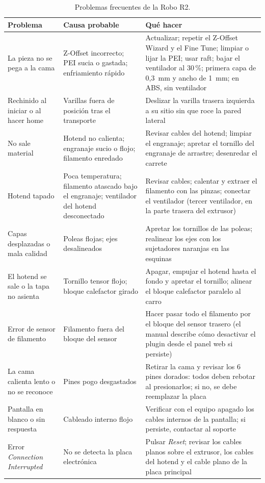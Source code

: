\begin{table}[H]
    \centering
    \caption{Problemas frecuentes de la Robo R2.}
    \label{tab:problemas}
    \small
    \begin{tabularx}{\linewidth}{>{\raggedright\arraybackslash}p{3.2cm} >{\raggedright\arraybackslash}X >{\raggedright\arraybackslash}X}
        \toprule
        \textbf{Problema} & \textbf{Causa probable} & \textbf{Qué hacer} \\
        \midrule
        La pieza no se pega a la cama & Z-Offset incorrecto; PEI sucia o gastada; enfriamiento rápido & Actualizar; repetir el Z-Offset Wizard y el Fine Tune; limpiar o lijar la PEI; usar raft; bajar el ventilador al 30\,\%; primera capa de 0,3~mm y ancho de 1~mm; en ABS, sin ventilador \\
        \midrule
        Rechinido al iniciar o al hacer home & Varillas fuera de posición tras el transporte & Deslizar la varilla trasera izquierda a su sitio sin que roce la pared lateral \\
        \midrule
        No sale material & Hotend no calienta; engranaje sucio o flojo; filamento enredado & Revisar cables del hotend; limpiar el engranaje; apretar el tornillo del engranaje de arrastre; desenredar el carrete \\
        \midrule
        Hotend tapado & Poca temperatura; filamento atascado bajo el engranaje; ventilador del hotend desconectado & Revisar cables; calentar y extraer el filamento con las pinzas; conectar el ventilador (tercer ventilador, en la parte trasera del extrusor) \\
        \midrule
        Capas desplazadas o mala calidad & Poleas flojas; ejes desalineados & Apretar los tornillos de las poleas; realinear los ejes con los sujetadores naranjas en las esquinas \\
        \midrule
        El hotend se sale o la tapa no asienta & Tornillo tensor flojo; bloque calefactor girado & Apagar, empujar el hotend hasta el fondo y apretar el tornillo; alinear el bloque calefactor paralelo al carro \\
        \midrule
        Error de sensor de filamento & Filamento fuera del bloque del sensor & Hacer pasar todo el filamento por el bloque del sensor trasero (el manual describe cómo desactivar el plugin desde el panel web si persiste) \\
        \midrule
        La cama calienta lento o no se reconoce & Pines pogo desgastados & Retirar la cama y revisar los 6 pines dorados: todos deben rebotar al presionarlos; si no, se debe reemplazar la placa \\
        \midrule
        Pantalla en blanco o sin respuesta & Cableado interno flojo & Verificar con el equipo apagado los cables internos de la pantalla; si persiste, contactar al soporte \\
        \midrule
        Error \emph{Connection Interrupted} & No se detecta la placa electrónica & Pulsar \emph{Reset}; revisar los cables planos sobre el extrusor, los cables del hotend y el cable plano de la placa principal \\
        \bottomrule
    \end{tabularx}
\end{table}

